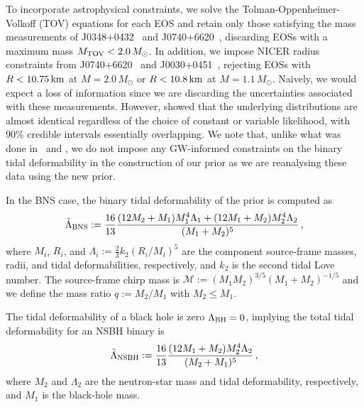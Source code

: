 \documentclass[twocolumn,linenumbers]{aastex631}
\begin{document}
To incorporate astrophysical constraints, we solve the
Tolman-Oppenheimer-Volkoff (TOV) equations for each EOS and retain only
those satisfying the mass measurements of J0348+0432~\citep[][$M =
  2.01\pm 0.04\,M_{\odot}$]{Antoniadis2013} and J0740+6620~\citep[][$M =
  2.08 \pm 0.07\,M_{\odot}$]{Cromartie2019, Fonseca2021}, discarding EOSs
with a maximum mass $M_{\rm TOV} < 2.0\,M_{\odot}$. In addition, we
impose NICER radius constraints from J0740+6620~\citep{Miller2021,
  Riley2021} and J0030+0451~\citep{Riley2019, MCMiller2019b}, rejecting
EOSs with $R < 10.75\,\rm km$ at $M = 2.0\,M_{\odot}$ or $R < 10.8\,\rm
km$ at $M = 1.1\,M_{\odot}$.  Naively, we would expect a loss of
information since we are discarding the uncertainties associated with
these measurements.  However, \citet{2023Jiang} showed that the
underlying distributions are almost identical regardless of the choice of
constant or variable likelihood, with $90\%$ credible intervals
essentially overlapping. We note that, unlike what was done
in~\citet{Altiparmak:2022} and \citet{Ecker:2022dlg}, we do not impose
any GW-informed constraints on the binary tidal deformability in the
construction of our prior as we are reanalysing these data using the new
prior.
	
In the BNS case, the binary tidal deformability of the prior is computed
as
%
\begin{equation} 
 \tilde{\Lambda}_{\rm BNS} := \frac{16}{13} \frac{ (12M_2 + M_1) M_1^4
   \Lambda_1 + (12M_1 + M_2) M_2^4 \Lambda_2}{(M_1 + M_2)^5}\,,
\end{equation}
%
where $M_i$, $R_i$, and $\Lambda_i := \frac{2}{3} k_2 \left( R_i/M_i
\right)^5$ are the component source-frame masses, radii, and tidal
deformabilities, respectively, and $k_2$ is the second tidal Love
number. The source-frame chirp mass is $\mathcal{M} := (M_1
M_2)^{3/5} (M_1+M_2)^{-1/5}$ and we define the mass ratio $q := M_2/M_1$
with $M_2\le M_1$.
	
The tidal deformability of a black hole is zero $\Lambda_{\rm BH}=0$,
implying the total tidal deformability for an NSBH binary is
%
\begin{equation} 
 \tilde{\Lambda}_{{\rm NSBH}} := \frac{16}{13} \frac{ (12M_{1} + M_{2})
   M_{2}^4 \Lambda_{2}}{(M_{2} + M_{1})^5}\,,
 \end{equation}
%
where $M_{2}$ and $\Lambda_{2}$ are the neutron-star mass and
tidal deformability, respectively, and $M_{1}$ is the black-hole
mass. 

\end{document}
